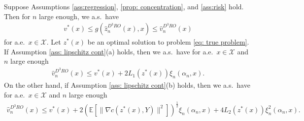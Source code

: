 \documentclass[onefignum,onetabnum]{siamart251216}
\begin{document}
\begin{lemma}\label{lemma: v inequality}
    Suppose Assumptions \ref{ass:regression}, \ref{prop: concentration}, and \ref{ass:risk} hold. Then for $n$ large enough, we a.s.\ have 
    \begin{align}\label{eq:lemma equation}
        v^*(x) \leq g(\hat{z}_n^{D^3RO}(x),x) \leq \hat{v}_n^{D^3RO}(x)
    \end{align}
    for a.e.\ $x \in \mathcal{X}$.
    Let $z^*(x)$ be an optimal solution to  problem \eqref{eq: true problem}. If Assumption \ref{ass: lipschitz cont}(a) holds, then we a.s.\ have for a.e.\ $x \in \mathcal{X}$ and $n$ large enough
    \begin{align}\label{eq: 4a}
    \hat{v}_n^{D^3RO}(x) \leq v^*(x) + 2L_1(z^*(x)) \xi_n(\alpha_n,x).
    \end{align}
    On the other hand, if Assumption \ref{ass: lipschitz cont}(b) holds, then we a.s.\ have for a.e.\ $x \in \mathcal{X}$ and $n$ large enough
    \begin{align}\label{eq:4b}
    \hat{v}_n^{D^3RO}(x) \leq v^*(x) + 2\left(\mathbb{E}[\|\nabla c(z^*(x),Y)\|^2]\right)^{\frac{1}{2}} \xi_n(\alpha_n,x) + 4L_2(z^*(x)) \xi_n^2(\alpha_n,x).
    \end{align}
\end{lemma}
\end{document}
